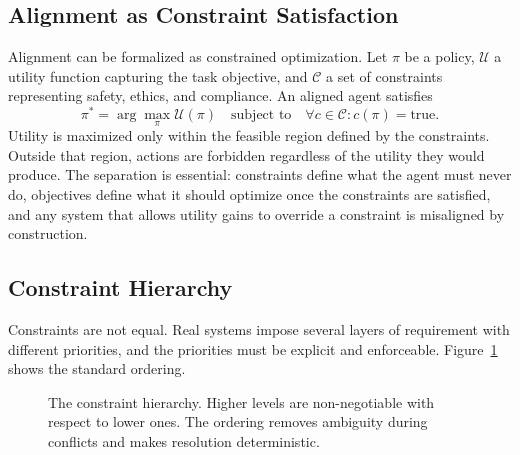 \documentclass[11pt]{book}
\begin{document}
\subsection{Alignment as Constraint Satisfaction}

Alignment can be formalized as constrained optimization. Let $\pi$ be a policy, $\mathcal{U}$ a utility function capturing the task objective, and $\mathcal{C}$ a set of constraints representing safety, ethics, and compliance. An aligned agent satisfies
\[
\pi^* = \arg\max_{\pi} \mathcal{U}(\pi) \quad \text{subject to} \quad \forall c \in \mathcal{C}: c(\pi) = \text{true}.
\]
Utility is maximized only within the feasible region defined by the constraints. Outside that region, actions are forbidden regardless of the utility they would produce. The separation is essential: constraints define what the agent must never do, objectives define what it should optimize once the constraints are satisfied, and any system that allows utility gains to override a constraint is misaligned by construction.

\subsection{Constraint Hierarchy}

Constraints are not equal. Real systems impose several layers of requirement with different priorities, and the priorities must be explicit and enforceable. Figure~\ref{fig:constraint-hierarchy} shows the standard ordering.

\begin{figure}[htbp]
\centering
{}
\caption{The constraint hierarchy. Higher levels are non-negotiable with respect to lower ones. The ordering removes ambiguity during conflicts and makes resolution deterministic.}
\label{fig:constraint-hierarchy}
\end{figure}
\end{document}
